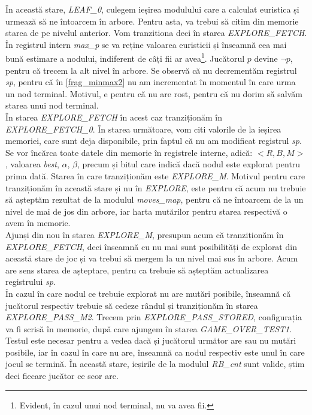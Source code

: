 \documentclass[12pt,twoside,a4paper,fleqn]{book}
\theoremstyle{definition}
\begin{document}
În această stare, \emph{LEAF\_0}, culegem ieșirea modulului care a calculat euristica și urmează să ne întoarcem în arbore. Pentru asta, va trebui să citim din memorie starea de pe nivelul anterior. Vom tranzitiona deci în starea \emph{EXPLORE\_FETCH}. În registrul intern \emph{max\_p} se va reține valoarea euristicii și înseamnă cea mai bună estimare a nodului, indiferent de câți fii ar avea\footnote{Evident, în cazul unui nod terminal, nu va avea fii.}. Jucătorul $p$ devine $\lnot p$, pentru că trecem la alt nivel în arbore. Se observă că nu decrementăm registrul \emph{sp}, pentru că în \ref{frag_minmax2} nu am incrementat în momentul în care urma un nod terminal. Motivul, e pentru că nu are rost, pentru că nu dorim să salvăm starea unui nod terminal.\\
În starea \emph{EXPLORE\_FETCH} în acest caz tranziționăm în \emph{EXPLORE\_FETCH\_0}. În starea următoare, vom citi valorile de la ieșirea memoriei, care sunt deja disponibile, prin faptul că nu am modificat registrul \emph{sp}. Se vor încărca toate datele din memorie în registrele interne, adică: $<R, B, M>$, valoarea \emph{best}, $\alpha$, $\beta$, precum și bitul care indică dacă nodul este explorat pentru prima dată. Starea în care tranziționăm este \emph{EXPLORE\_M}. Motivul pentru care tranziționăm în această stare și nu în \emph{EXPLORE}, este pentru că acum nu trebuie să așteptăm rezultat de la modulul \emph{moves\_map}, pentru că ne întoarcem de la un nivel de mai de jos din arbore, iar harta mutărilor pentru starea respectivă o avem în memorie.\\
Ajunși din nou în starea \emph{EXPLORE\_M}, presupun acum că tranziționăm în \emph{EXPLORE\_FETCH}, deci înseamnă cu nu mai sunt posibilități de explorat din această stare de joc și va trebui să mergem la un nivel mai sus în arbore. Acum are sens starea de așteptare, pentru ca trebuie să așteptăm actualizarea registrului \emph{sp}.\\
În cazul în care nodul ce trebuie explorat nu are mutări posibile, înseamnă că jucătorul respectiv trebuie să cedeze rândul și tranziționăm în starea \emph{EXPLORE\_PASS\_M2}. Trecem prin \emph{EXPLORE\_PASS\_STORED}, configurația va fi scrisă în memorie, după care ajungem în starea \emph{GAME\_OVER\_TEST1}. Testul este necesar pentru a vedea dacă și jucătorul următor are sau nu mutări posibile, iar în cazul în care nu are, înseamnă ca nodul respectiv este unul în care jocul se termină. În această stare, ieșirile de la modulul \emph{RB\_cnt} sunt valide, știm deci fiecare jucător ce scor are.\\
\end{document}
